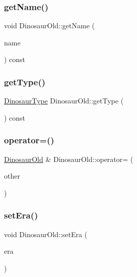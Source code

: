\subsubsection{\texorpdfstring{get\+Name()}{getName()}}
{\footnotesize\ttfamily void Dinosaur\+Old\+::get\+Name (\begin{DoxyParamCaption}\item[{char $\ast$\&}]{name }\end{DoxyParamCaption}) const}

\mbox{\label{classDinosaurOld_a4e81fc884eded2c8298abbcd080bc5df}} 
\subsubsection{\texorpdfstring{get\+Type()}{getType()}}
{\footnotesize\ttfamily \hyperlink{DinosaurOld_8hpp_a9f8d7b1c3f7b7d03f4101875fa35e8ea}{Dinosaur\+Type} Dinosaur\+Old\+::get\+Type (\begin{DoxyParamCaption}{ }\end{DoxyParamCaption}) const}

\mbox{\label{classDinosaurOld_a37145f147c7b14211f27f73ffcf1613a}} 
\subsubsection{\texorpdfstring{operator=()}{operator=()}}
{\footnotesize\ttfamily \hyperlink{classDinosaurOld}{Dinosaur\+Old} \& Dinosaur\+Old\+::operator= (\begin{DoxyParamCaption}\item[{const \hyperlink{classDinosaurOld}{Dinosaur\+Old} \&}]{other }\end{DoxyParamCaption})}

\mbox{\label{classDinosaurOld_a679b68bb5d0b02e318153fe95702bedc}} 
\subsubsection{\texorpdfstring{set\+Era()}{setEra()}}
{\footnotesize\ttfamily void Dinosaur\+Old\+::set\+Era (\begin{DoxyParamCaption}\item[{const \hyperlink{DinosaurOld_8hpp_aa47f0b0878c65fb93dcaf8fde26dfaa5}{Dinosaur\+Era}}]{era }\end{DoxyParamCaption})}

